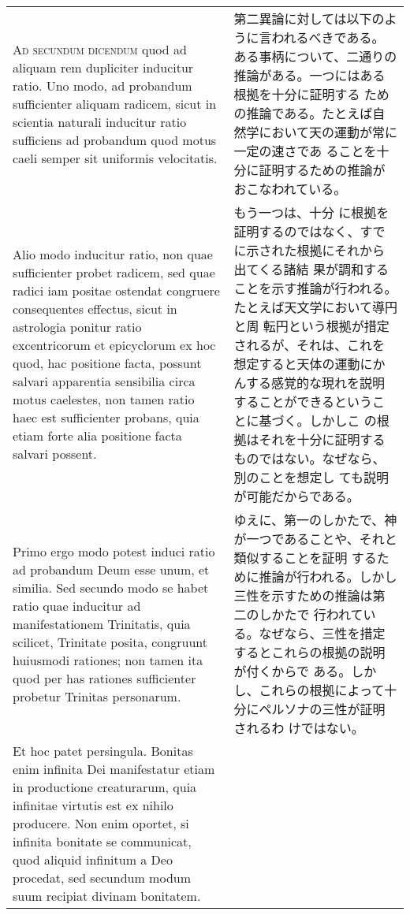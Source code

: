 \documentclass[10pt]{jsarticle} %
\begin{document}
\begin{longtable}{p{21em}p{21em}}
{\scshape Ad secundum dicendum} quod ad aliquam rem dupliciter inducitur
ratio. Uno modo, ad probandum sufficienter aliquam radicem, sicut in
scientia naturali inducitur ratio sufficiens ad probandum quod motus
caeli semper sit uniformis velocitatis. 


&

第二異論に対しては以下のように言われるべきである。
ある事柄について、二通りの推論がある。一つにはある根拠を十分に証明する
 ための推論である。たとえば自然学において天の運動が常に一定の速さであ
 ることを十分に証明するための推論がおこなわれている。


\\


Alio modo inducitur ratio, non
quae sufficienter probet radicem, sed quae radici iam positae ostendat
congruere consequentes effectus, sicut in astrologia ponitur ratio
excentricorum et epicyclorum ex hoc quod, hac positione facta, possunt
salvari apparentia sensibilia circa motus caelestes, non tamen ratio
haec est sufficienter probans, quia etiam forte alia positione facta
salvari possent. 


&

もう一つは、十分
 に根拠を証明するのではなく、すでに示された根拠にそれから出てくる諸結
 果が調和することを示す推論が行われる。たとえば天文学において導円と周
 転円という根拠が措定されるが、それは、これを想定すると天体の運動にか
 んする感覚的な現れを説明することができるということに基づく。しかしこ
 の根拠はそれを十分に証明するものではない。なぜなら、別のことを想定し
 ても説明が可能だからである。

\\


Primo ergo modo potest induci ratio ad probandum Deum
esse unum, et similia. Sed secundo modo se habet ratio quae inducitur
ad manifestationem Trinitatis, quia scilicet, Trinitate posita,
congruunt huiusmodi rationes; non tamen ita quod per has rationes
sufficienter probetur Trinitas personarum. 


&

ゆえに、第一のしかたで、神が一つであることや、それと類似することを証明
 するために推論が行われる。しかし三性を示すための推論は第二のしかたで
行われている。なぜなら、三性を措定するとこれらの根拠の説明が付くからで
 ある。しかし、これらの根拠によって十分にペルソナの三性が証明されるわ
 けではない。


\\

Et hoc patet persingula. 
Bonitas enim infinita Dei manifestatur etiam in productione
creaturarum, quia infinitae virtutis est ex nihilo producere. Non enim
oportet, si infinita bonitate se communicat, quod aliquid infinitum a
Deo procedat, sed secundum modum suum recipiat divinam
bonitatem. 



\end{longtable}
\end{document}

